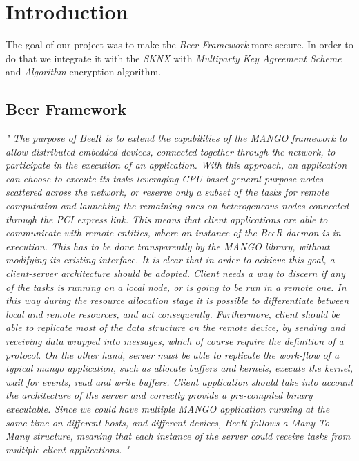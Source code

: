 \section{Introduction}
The goal of our project was to make the \emph{Beer Framework} more secure.
In order to do that we integrate it with the \emph{SKNX} with \emph{Multiparty Key Agreement Scheme} and \emph{\color{red} Algorithm} encryption algorithm.

\subsection{Beer Framework}
\emph{" The purpose of BeeR is to extend the capabilities of the MANGO framework
	to allow distributed embedded devices, connected together through the network,
	to participate in the execution of an application. With this approach, an application
	can choose to execute its tasks leveraging CPU-based general purpose
	nodes scattered across the network, or reserve only a subset of the tasks for remote
	computation and launching the remaining ones on heterogeneous nodes
	connected through the PCI express link. This means that client applications are
	able to communicate with remote entities, where an instance of the BeeR daemon
	is in execution. This has to be done transparently by the MANGO library,
	without modifying its existing interface.
	It is clear that in order to achieve this goal, a client-server architecture should
	be adopted. Client needs a way to discern if any of the tasks is running on a
	local node, or is going to be run in a remote one. In this way during the resource
	allocation stage it is possible to differentiate between local and remote resources,
	and act consequently. Furthermore, client should be able to replicate most of the
	data structure on the remote device, by sending and receiving data wrapped into
	messages, which of course require the definition of a protocol. On the other hand,
	server must be able to replicate the work-flow of a typical mango application,
	such as allocate buffers and kernels, execute the kernel, wait for events, read and
	write buffers. Client application should take into account the architecture of the
	server and correctly provide a pre-compiled binary executable. Since we could
	have multiple MANGO application running at the same time on different hosts,
	and different devices, BeeR follows a Many-To-Many structure, meaning that
	each instance of the server could receive tasks from multiple client applications. "}\\


